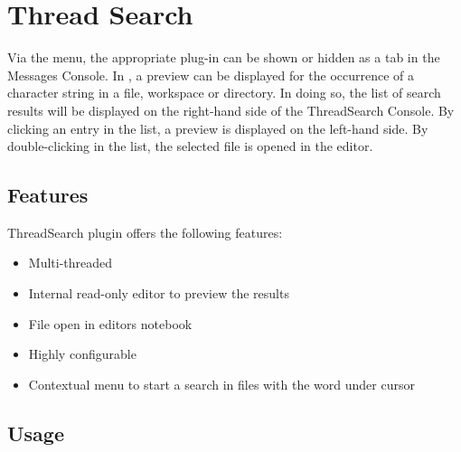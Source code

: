\section{Thread Search}\label{sec:thread_search}

Via the  menu, the appropriate plug-in can be shown or hidden as a tab in the Messages Console. In \codeblocks, a preview can be displayed for the occurrence of a character string in a file, workspace or directory. In doing so, the list of search results will be displayed on the right-hand side of the ThreadSearch Console. By clicking an entry in the list, a preview is displayed on the left-hand side. By double-clicking in the list, the selected file is opened in the \codeblocks editor.


\subsection{Features}

ThreadSearch plugin offers the following features:

\begin{itemize}
\item Multi-threaded 
\item Internal read-only editor to preview the results
\item File open in editors notebook
\item Highly configurable
\item Contextual menu  to start a search in files with the word under cursor
\end{itemize}


\subsection{Usage}

